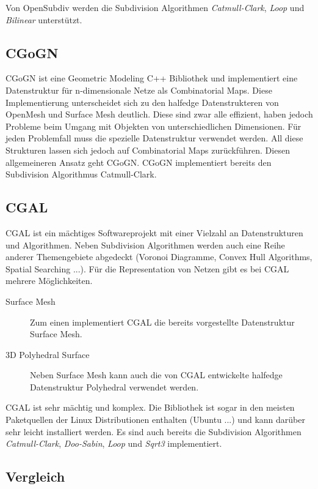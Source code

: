 Von OpenSubdiv werden die Subdivision Algorithmen \emph{Catmull-Clark}, \emph{Loop} und \emph{Bilinear} unterstützt. \cite{Pixar.27.07.2015}

\subsection{CGoGN}

CGoGN ist eine Geometric Modeling C++ Bibliothek und implementiert eine Datenstruktur für n-dimensionale Netze als Combinatorial Maps.
Diese Implementierung unterscheidet sich zu den halfedge Datenstrukteren von OpenMesh und Surface Mesh deutlich.
Diese sind zwar alle effizient, haben jedoch Probleme beim Umgang mit Objekten von unterschiedlichen Dimensionen.
Für jeden Problemfall muss die spezielle Datenstruktur verwendet werden.
All diese Strukturen lassen sich jedoch auf Combinatorial Maps zurückführen.
Diesen allgemeineren Ansatz geht CGoGN.
CGoGN implementiert bereits den Subdivision Algorithmus Catmull-Clark. \cite{CGoGN.27.07.2015}

\subsection{\acf{CGAL}}

\ac{CGAL} ist ein mächtiges Softwareprojekt mit einer Vielzahl an Datenstrukturen und Algorithmen.
Neben Subdivision Algorithmen werden auch eine Reihe anderer Themengebiete abgedeckt (Voronoi Diagramme, Convex Hull Algorithms, Spatial Searching ...).
Für die Representation von Netzen gibt es bei \acs{CGAL} mehrere Möglichkeiten.

\begin{description}
 \item[Surface Mesh] Zum einen implementiert \acs{CGAL} die bereits vorgestellte Datenstruktur Surface Mesh.
 \item[3D Polyhedral Surface] Neben Surface Mesh kann auch die von \acs{CGAL} entwickelte halfedge Datenstruktur Polyhedral verwendet werden.
\end{description}

\acs{CGAL} ist sehr mächtig und komplex. Die Bibliothek ist sogar in den meisten Paketquellen der Linux Distributionen enthalten (Ubuntu ...)
und kann darüber sehr leicht installiert werden.
Es sind auch bereits die Subdivision Algorithmen \emph{Catmull-Clark}, \emph{Doo-Sabin}, \emph{Loop} und \emph{Sqrt3} implementiert. \cite{CGAL.27.07.2015}

\subsection{Vergleich}

